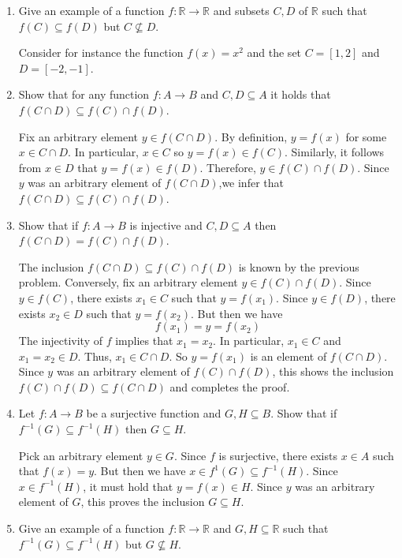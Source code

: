 \documentclass[12pt, reqno]{article}
\numberwithin{equation}{section}
\theoremstyle{definition}
\theoremstyle{remark}
\newcommand{\RR}{\mathbb{R}}
\begin{document}
\begin{enumerate}[leftmargin=*]
	\item Give an example of a function $f:\RR\to \RR$ and subsets $C, D$ of $\RR$ such that $f(C) \subseteq f(D)$ but $C\not\subseteq D$.

	      Consider for instance the function $f(x)=x^2$ and the set $C = [1,2]$ and $D = [-2, -1]$.

	\item Show that for any function $f : A\to B$ and $C, D\subseteq A$ it holds that $f(C\cap D) \subseteq f(C)\cap f(D)$.

	      Fix an arbitrary element $y\in f(C\cap D)$. By definition, $y = f(x)$ for some $x\in C\cap D$. In particular, $x\in C$ so $y = f(x) \in f(C)$. Similarly, it follows from $x\in D$ that $y = f(x)\in f(D)$. Therefore, $y\in f(C)\cap f(D)$. Since $y$ was an arbitrary element of $f(C\cap D)$,we infer that $f(C\cap D)\subseteq f(C)\cap f(D)$.

	\item Show that if $f : A\to B$ is injective and $C, D\subseteq A$ then $f(C\cap D) = f(C)\cap f(D)$.

	      The inclusion $f(C\cap D)\subseteq f(C)\cap f(D)$ is known by the previous problem. Conversely, fix an arbitrary element $y\in f(C)\cap f(D)$. Since $y\in f(C)$, there exists $x_1\in C$ such that $y = f(x_1)$. Since $y\in f(D)$, there exists $x_2\in D$ such that $y = f(x_2)$. But then we have
	      \[
		      f(x_1) = y = f(x_2)
	      \]
	      The injectivity of $f$ implies that $x_1 = x_2$. In particular, $x_1 \in C$ and $x_1 = x_2 \in D$. Thus, $x_1 \in C\cap D$. So $y = f(x_1)$ is an element of $f(C\cap D)$. Since $y$ was an arbitrary element of $f(C)\cap f(D)$, this shows the inclusion $f(C)\cap f(D)\subseteq f(C\cap D)$ and completes the proof.

	\item Let $f:A\to B$ be a surjective function and $G, H \subseteq B$. Show that if $f^{-1}(G) \subseteq f^{-1}(H)$ then $G\subseteq H$.

	      Pick an arbitrary element $y\in G$. Since $f$ is surjective, there exists $x\in A$ such that $f(x) = y$. But then we have $x\in f^{1}(G) \subseteq f^{-1}(H)$. Since $x\in f^{-1}(H)$, it must hold that $y = f(x) \in H$. Since $y$ was an arbitrary element of $G$, this proves the inclusion $G\subseteq H$.

	\item Give an example of a function $f:\RR\to \RR$ and $G, H\subseteq \RR$ such that $f^{-1}(G)\subseteq f^{-1}(H)$ but $G\not\subseteq H$.


\end{enumerate}
\end{document}
